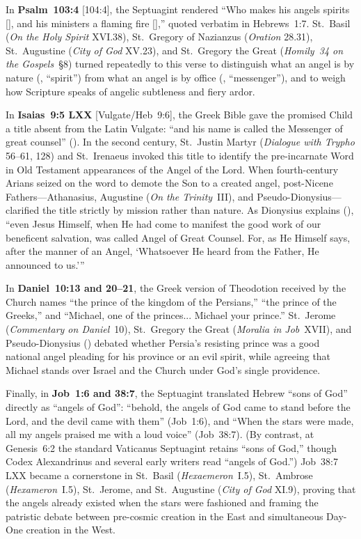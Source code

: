 In \textbf{Psalm~103:4} [104:4], the Septuagint rendered ``Who makes his angels spirits [], and his ministers a flaming fire [],'' quoted verbatim in Hebrews~1:7. St.~Basil (\emph{On the Holy Spirit} XVI.38), St.~Gregory of Nazianzus (\emph{Oration} 28.31), St.~Augustine (\emph{City of God} XV.23), and St.~Gregory the Great (\emph{Homily~34 on the Gospels}~\S 8) turned repeatedly to this verse to distinguish what an angel is by nature (, ``spirit'') from what an angel is by office (, ``messenger''), and to weigh how Scripture speaks of angelic subtleness and fiery ardor.

In \textbf{Isaias~9:5 LXX} [Vulgate/Heb~9:6], the Greek Bible gave the promised Child a title absent from the Latin Vulgate: ``and his name is called the Messenger of great counsel'' (). In the second century, St.~Justin Martyr (\emph{Dialogue with Trypho} 56--61, 128) and St.~Irenaeus invoked this title to identify the pre-incarnate Word in Old Testament appearances of the Angel of the Lord. When fourth-century Arians seized on the word  to demote the Son to a created angel, post-Nicene Fathers---Athanasius, Augustine (\emph{On the Trinity}~III), and Pseudo-Dionysius---clarified the title strictly by mission rather than nature. As Dionysius explains (), ``even Jesus Himself, when He had come to manifest the good work of our beneficent salvation, was called Angel of Great Counsel. For, as He Himself says, after the manner of an Angel, `Whatsoever He heard from the Father, He announced to us.'''

In \textbf{Daniel~10:13 and 20--21}, the Greek version of Theodotion received by the Church names ``the prince of the kingdom of the Persians,'' ``the prince of the Greeks,'' and ``Michael, one of the princes... Michael your prince.'' St.~Jerome (\emph{Commentary on Daniel}~10), St.~Gregory the Great (\emph{Moralia in Job}~XVII), and Pseudo-Dionysius () debated whether Persia's resisting prince was a good national angel pleading for his province or an evil spirit, while agreeing that Michael stands over Israel and the Church under God's single providence.

Finally, in \textbf{Job~1:6 and 38:7}, the Septuagint translated Hebrew ``sons of God'' directly as ``angels of God'': ``behold, the angels of God came to stand before the Lord, and the devil came with them'' (Job~1:6), and ``When the stars were made, all my angels praised me with a loud voice'' (Job~38:7). (By contrast, at Genesis~6:2 the standard Vaticanus Septuagint retains ``sons of God,'' though Codex Alexandrinus and several early writers read ``angels of God.'') Job~38:7 LXX became a cornerstone in St.~Basil (\emph{Hexaemeron}~I.5), St.~Ambrose (\emph{Hexameron}~I.5), St.~Jerome, and St.~Augustine (\emph{City of God} XI.9), proving that the angels already existed when the stars were fashioned and framing the patristic debate between pre-cosmic creation in the East and simultaneous Day-One creation in the West.

